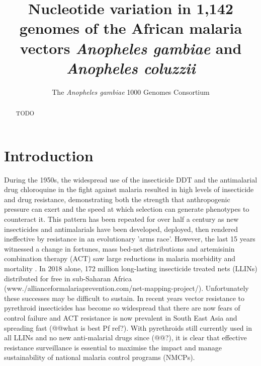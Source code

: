 \documentclass[a4paper,11pt,abstracton,hidelinks]{scrartcl}
\title{
Nucleotide variation in 1,142 genomes of the African malaria vectors \emph{Anopheles gambiae} and \emph{Anopheles coluzzii}
}
\author[1]{\small The \emph{Anopheles gambiae} 1000 Genomes Consortium}
\affil[1]{\footnotesize A list of consortium members appears at the end of the paper}
\begin{document}
\maketitle


\begin{abstract}

TODO

\end{abstract}


\section*{Introduction}


During the 1950s, the widespread use of the insecticide DDT and the antimalarial drug chloroquine in the fight against malaria resulted in high levels of insecticide and drug resistance, demonstrating both the strength that anthropogenic pressure can exert and the speed at which selection can generate phenotypes to counteract it.
%
This pattern has been repeated for over half a century as new insecticides and antimalarials have been developed, deployed, then rendered ineffective by resistance in an evolutionary 'arms race'.
%
However, the last 15 years witnessed a change in fortunes, mass bed-net distributions and artemisinin combination therapy (ACT) saw large reductions in malaria morbidity and mortality \cite{Bhatt2015}.
%
In 2018 alone, 172 million long-lasting insecticide treated nets (LLINs) distributed for free in sub-Saharan Africa (www./allianceformalariaprevention.com/net-mapping-project/).
%
Unfortunately these successes may be difficult to sustain.
%
In recent years vector resistance to pyrethroid insecticides has become so widespread that there are now fears of control failure \cite{churcher2016, Hemingway2016} and ACT resistance is now prevalent in South East Asia and spreading fast (@@what is best Pf ref?).
%
With pyrethroids still currently used in all LLINs and no new anti-malarial drugs since (@@?), it is clear that effective resistance surveillance is essential to maximise the impact and manage sustainability of national malaria control programs (NMCPs). 
\end{document}
